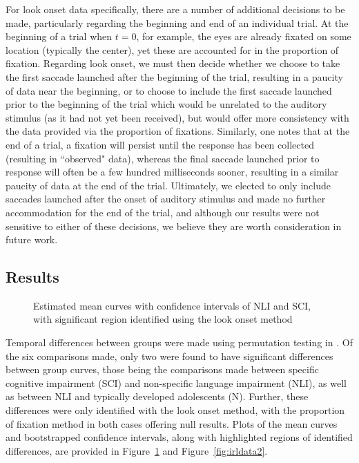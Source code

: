 For look onset data specifically, there are a number of additional decisions to be made, particularly regarding the beginning and end of an individual trial. At the beginning of a trial when $t = 0$, for example, the eyes are already fixated on some location (typically the center), yet these are accounted for in the proportion of fixation. Regarding look onset, we must then decide whether we choose to take the first saccade launched after the beginning of the trial, resulting in a paucity of data near the beginning, or to choose to include the first saccade launched prior to the beginning of the trial which would be unrelated to the auditory stimulus (as it had not yet been received), but would offer more consistency with the data provided via the proportion of fixations. Similarly, one notes that at the end of a trial, a fixation will persist until the response has been collected (resulting in ``observed" data), whereas the final saccade launched prior to response will often be a few hundred milliseconds sooner, resulting in a similar paucity of data at the end of the trial. Ultimately, we elected to only include saccades launched after the onset of auditory stimulus and made no further accommodation for the end of the trial, and although our results were not sensitive to either of these decisions, we believe they are worth consideration in future work.


\subsection{Results}

\begin{figure}[H]
    \centering
    \caption{Estimated mean curves with confidence intervals of NLI and SCI, with significant region identified using the look onset method}
\label{fig:irldata1}
\end{figure}

Temporal differences between groups were made using permutation testing in . Of the six comparisons made, only two were found to have significant differences between group curves, those being the comparisons made between specific cognitive impairment (SCI) and non-specific language impairment (NLI), as well as between NLI and typically developed adolescents (N). Further, these differences were only identified with the look onset method, with the proportion of fixation method in both cases offering null results. Plots of the mean curves and bootstrapped confidence intervals, along with highlighted regions of identified differences, are provided in Figure~\ref{fig:irldata1} and Figure~\ref{fig:irldata2}.




